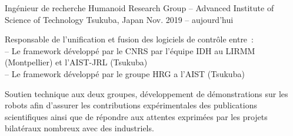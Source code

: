 
\begin{cventries}

  \cventry
    {Ingénieur de recherche} %
    {Humanoid Research Group -- Advanced Institute of Science of Technology} %
    {Tsukuba, Japan} %
    {Nov. 2019 -- aujourd'hui} %
    {
      \begin{cvitems} %
        \item Responsable de l'unification et fusion des logiciels de contrôle entre~:\\
          -- Le framework  développé par le CNRS par l'équipe IDH au LIRMM (Montpellier) et l'AIST-JRL (Tsukuba)\\
          -- Le framework  développé par le groupe HRG a l'AIST (Tsukuba)
        \item Soutien technique aux deux groupes, développement de démonstrations sur les robots afin d'assurer les contributions expérimentales des publications scientifiques ainsi que de répondre aux attentes exprimées par les projets bilatéraux nombreux avec des industriels.
      \end{cvitems}
    }


\end{cventries}
